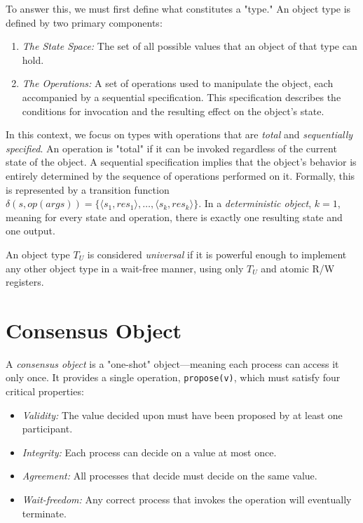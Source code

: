 To answer this, we must first define what constitutes a "type." An object type is defined by two primary components:
\begin{enumerate}
    \item \textit{The State Space:} The set of all possible values that an object of that type can hold.
    \item \textit{The Operations:} A set of operations used to manipulate the object, each accompanied by a sequential specification. This specification describes the conditions for invocation and the resulting effect on the object’s state.
\end{enumerate}
    
In this context, we focus on types with operations that are \textit{total} and \textit{sequentially specified}. An operation is "total" if it can be invoked regardless of the current state of the object. A sequential specification implies that the object’s behavior is entirely determined by the sequence of operations performed on it. Formally, this is represented by a transition function $\delta(s,op(args))=\{\langle s_1,res_1\rangle,\ldots,\langle s_k,res_k\rangle\}$. In a \textit{deterministic object}, $k=1$, meaning for every state and operation, there is exactly one resulting state and one output.

An object type $T_U$ is considered \textit{universal} if it is powerful enough to implement any other object type in a wait-free manner, using only $T_U$ and atomic R/W registers.

\section{Consensus Object}
A \textit{consensus object} is a "one-shot" object—meaning each process can access it only once. It provides a single operation, \texttt{propose(v)}, which must satisfy four critical properties:
\begin{itemize}
    \item \textit{Validity:} The value decided upon must have been proposed by at least one participant.
    \item \textit{Integrity:} Each process can decide on a value at most once.
    \item \textit{Agreement:} All processes that decide must decide on the same value.
    \item \textit{Wait-freedom:} Any correct process that invokes the operation will eventually terminate.
\end{itemize}

